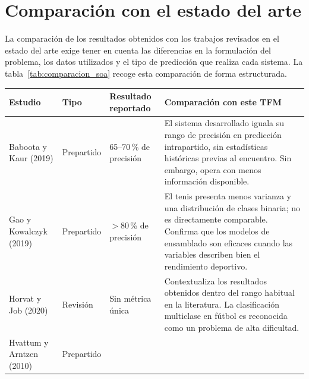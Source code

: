 \section{Comparación con el estado del arte}

La comparación de los resultados obtenidos con los trabajos revisados en el estado del arte exige tener en cuenta las diferencias en la formulación del problema, los datos utilizados y el tipo de predicción que realiza cada sistema. La tabla~\ref{tab:comparacion_soa} recoge esta comparación de forma estructurada.

\begin{table}[H]
    \centering
    \scriptsize
    \renewcommand{\arraystretch}{1.25}
    \begin{tabularx}{\textwidth}{|p{2.8cm}|p{1.8cm}|p{2.2cm}|X|}
        \hline
        \textbf{Estudio}                              & \textbf{Tipo} & \textbf{Resultado reportado} & \textbf{Comparación con este TFM}                                                                                               \\
        \hline
        Baboota y Kaur (2019)                         &
        Prepartido                                    &
        65--70\,\% de precisión                       &
        El sistema desarrollado iguala su rango de precisión en predicción intrapartido, sin estadísticas históricas previas al encuentro. Sin embargo, opera con menos información disponible.                                              \\
        \hline
        Gao y Kowalczyk (2019)                        &
        Prepartido                                    &
        $>$80\,\% de precisión                        &
        El tenis presenta menos varianza y una distribución de clases binaria; no es directamente comparable. Confirma que los modelos de ensamblado son eficaces cuando las variables describen bien el rendimiento deportivo.        \\
        \hline
        Horvat y Job (2020)                           &
        Revisión                                      &
        Sin métrica única                             &
        Contextualiza los resultados obtenidos dentro del rango habitual en la literatura. La clasificación multiclase en fútbol es reconocida como un problema de alta dificultad.                                                         \\
        \hline
        Hvattum y Arntzen (2010)                      &
        Prepartido                                    &

\end{tabularx}
\end{table}
